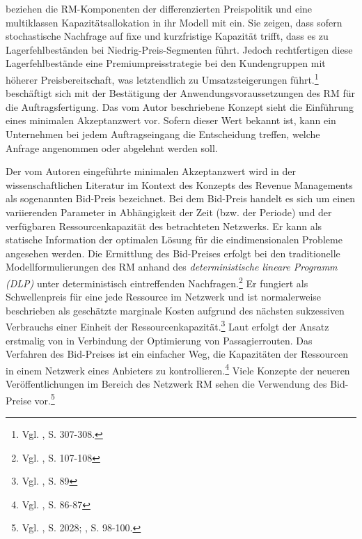 \cite{deBHarris1995299} beziehen die RM-Komponenten der differenzierten Preispolitik und eine multiklassen Kapazitätsallokation in ihr Modell mit ein. Sie zeigen, dass sofern stochastische Nachfrage auf fixe und kurzfristige Kapazität trifft, dass es zu Lagerfehlbeständen bei Niedrig-Preis-Segmenten führt. Jedoch rechtfertigen diese Lagerfehlbestände eine Premiumpreisstrategie bei den Kundengruppen mit höherer Preisbereitschaft, was letztendlich zu Umsatzsteigerungen führt.\footnote{Vgl. \cite{deBHarris1995299}, S. 307-308.} \cite{Kalyan:2002aa} beschäftigt sich mit der Bestätigung der Anwendungsvoraussetzungen des RM für die Auftragsfertigung. Das vom Autor beschriebene Konzept sieht die Einführung eines minimalen Akzeptanzwert vor. Sofern dieser Wert bekannt ist, kann ein Unternehmen bei jedem Auftragseingang die Entscheidung treffen, welche Anfrage angenommen oder abgelehnt werden soll.

Der vom Autoren \cite{Kalyan:2002aa} eingeführte minimalen Akzeptanzwert wird in der wissenschaftlichen Literatur im Kontext des Konzepts des Revenue Managements als sogenannten Bid-Preis bezeichnet. Bei dem Bid-Preis handelt es sich um einen variierenden Parameter in Abhängigkeit der Zeit (bzw. der Periode) und der verfügbaren Ressourcenkapazität des betrachteten Netzwerks. Er kann als statische Information der optimalen Lösung für die eindimensionalen Probleme angesehen werden. Die Ermittlung des Bid-Preises erfolgt bei den traditionelle Modellformulierungen des RM anhand des \textit{deterministische lineare Programm (DLP)} unter deterministisch eintreffenden Nachfragen.\footnote{Vgl. \cite{talluri2004revenue}, S. 107-108} %
Er fungiert als Schwellenpreis für eine jede Ressource im Netzwerk und ist normalerweise beschrieben als geschätzte marginale Kosten aufgrund des nächsten sukzessiven Verbrauchs einer Einheit der Ressourcenkapazität.\footnote{Vgl. \cite{talluri2004theory}, S. 89} Laut \cite{gonsch2013using} erfolgt der Ansatz erstmalig von \cite{talluri2001airline} in Verbindung der Optimierung von Passagierrouten. Das Verfahren des Bid-Preises ist ein einfacher Weg, die Kapazitäten der Ressourcen in einem Netzwerk eines Anbieters zu kontrollieren.\footnote{Vgl. \cite{talluri2004theory}, S. 86-87\label{RMH}} Viele Konzepte der neueren Veröffentlichungen im Bereich des Netzwerk RM sehen die Verwendung des Bid-Preise vor.\footnote{Vgl. \cite{petrick2010dynamic}, S. 2028; \cite{gonsch2013using}, S. 98-100.}

